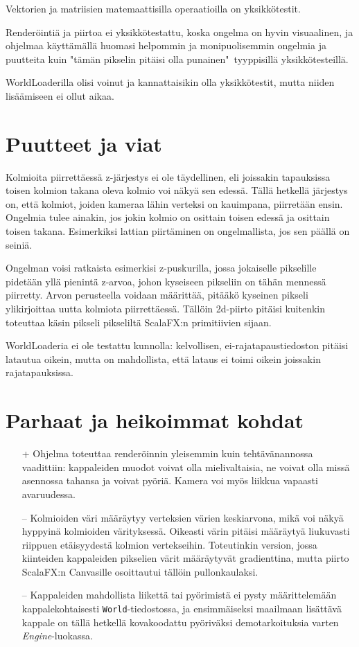 \documentclass[12pt] {article}
\begin{document}
Vektorien ja matriisien matemaattisilla operaatioilla on yksikkötestit.

Renderöintiä ja piirtoa ei yksikkötestattu, koska ongelma on hyvin visuaalinen, ja ohjelmaa käyttämällä huomasi helpommin ja monipuolisemmin ongelmia ja puutteita kuin "tämän pikselin pitäisi olla punainen"\ tyyppisillä yksikkötesteillä.

WorldLoaderilla olisi voinut ja kannattaisikin olla yksikkötestit, mutta niiden lisäämiseen ei ollut aikaa.

\section {Puutteet ja viat}

Kolmioita piirrettäessä z-järjestys ei ole täydellinen, eli joissakin tapauksissa toisen kolmion takana oleva kolmio voi näkyä sen edessä. Tällä hetkellä järjestys on, että kolmiot, joiden kameraa lähin verteksi on kauimpana, piirretään ensin. Ongelmia tulee ainakin, jos jokin kolmio on osittain toisen edessä ja osittain toisen takana. Esimerkiksi lattian piirtäminen on ongelmallista, jos sen päällä on seiniä.

Ongelman voisi ratkaista esimerkisi z-puskurilla, jossa jokaiselle pikselille pidetään yllä pienintä z-arvoa, johon kyseiseen pikseliin on tähän mennessä piirretty. Arvon perusteella voidaan määrittää, pitääkö kyseinen pikseli ylikirjoittaa uutta kolmiota piirrettäessä. Tällöin 2d-piirto pitäisi kuitenkin toteuttaa käsin pikseli pikseliltä ScalaFX:n primitiivien sijaan.

WorldLoaderia ei ole testattu kunnolla: kelvollisen, ei-rajatapaustiedoston pitäisi latautua oikein, mutta on mahdollista, että lataus ei toimi oikein joissakin rajatapauksissa.

\section {Parhaat ja heikoimmat kohdat}

\begin{itemize}
	\item[+] Ohjelma toteuttaa renderöinnin yleisemmin kuin tehtävänannossa vaadittiin: kappaleiden muodot voivat olla mielivaltaisia, ne voivat olla missä asennossa tahansa ja voivat pyöriä. Kamera voi myös liikkua vapaasti avaruudessa.
	\item[--] Kolmioiden väri määräytyy verteksien värien keskiarvona, mikä voi näkyä hyppyinä kolmioiden värityksessä. Oikeasti värin pitäisi määräytyä liukuvasti riippuen etäisyydestä kolmion vertekseihin. Toteutinkin version, jossa kiinteiden kappaleiden pikselien värit määräytyvät gradienttina, mutta piirto ScalaFX:n Canvasille osoittautui tällöin pullonkaulaksi.
	\item[--] Kappaleiden mahdollista liikettä tai pyörimistä ei pysty määrittelemään kappalekohtaisesti \texttt{World}-tiedostossa, ja ensimmäiseksi maailmaan lisättävä kappale on tällä hetkellä kovakoodattu pyöriväksi demotarkoituksia varten \textit{Engine}-luokassa.
\end{itemize}
\end{document}
